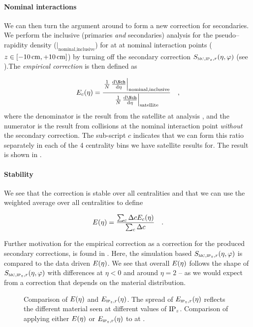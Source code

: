 \paragraph{Nominal interactions} 
We can then turn the argument around to form a new correction for
secondaries.  We perform the inclusive (primaries \emph{and}
secondaries) analysis for the pseudo--rapidity density
(\ndndeta{}$|_{\text{nominal,inclusive}}$) for \PbPbCol{} at
 at nominal interaction points
($z\in[\unit[-10]{\text{cm}},\unit[+10]{\text{cm}}]$) by turning off
the secondary correction $\SecMap$ (see
).The \emph{empirical correction} is then
defined as

\begin{equation}
  \label{eq:empirical:cent}
  \EmpCor[c]{} = \frac{%
    \left.\ndndeta\right|_{\text{nominal,inclusive}}}{%
    \left.\ndndeta\right|_{\text{satellite}}}\quad,
\end{equation}
where the denominator is the result from the satellite \PbPbCol{} at
 analysis \cite{Abbas:2013bpa}, and the numerator is
the result from collisions at the nominal interaction point
\emph{without} the secondary correction.  The sub-script $c$ indicates
that we can form this ratio separately in each of the 4 centrality
bins we have satellite results for.  The result is shown in
.

\paragraph{Stability}
We see that the correction is stable over all centralities and that we
can use the weighted average over all centralities to define 

\begin{equation}
  \label{eq:empirical}
  \EmpCor{} = \frac{\sum_c \Delta c\EmpCor[c]{}}{\sum_c \Delta c}\quad.
\end{equation}

Further motivation for the empirical correction as a correction for
the produced secondary corrections, is found in
.  Here, the simulation based $\SecMap$
is compared to the data driven $\EmpCor$.  We see that overall
$\EmpCor$ follows the shape of $\SecMap$ with differences at $\eta<0$
and around $\eta=2$ -- as we would expect from a correction that
depends on the material distribution.

\begin{figure}[h!tbp]
  \centering
  \caption{ Comparison of $\EmpCor$ and
    $\EmpCor[\subIPz,r]{}$.  The spread of $\EmpCor[\subIPz,r]{}$
    reflects the different material seen at different values of
    $\IPz$.    Comparison of applying
    either $\EmpCor$ or $\EmpCor[\subIPz,r]{}$ to \ppCol{} at
    . }
  \label{fig:empirical:methods}
\end{figure}

